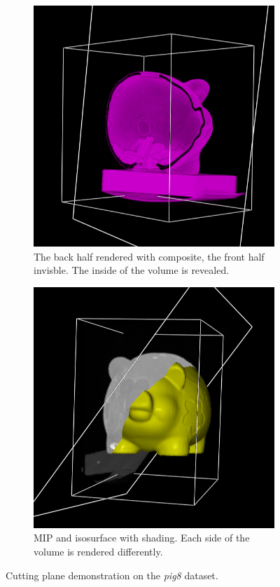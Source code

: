 \documentclass[a4paper]{article}
\begin{document}
\begin{figure}[h]
  \centering
  \begin{subfigure}[b]{0.45\textwidth}
    \centering
    \includegraphics[width=\textwidth]{pig8-cut-plane-coins}
    \caption{The back half rendered with composite, the front half invisble. The inside of the volume is revealed.}
  \end{subfigure}
  \hfill
  \begin{subfigure}[b]{0.45\textwidth}
    \centering
    \includegraphics[width=\textwidth]{pig8-cut-plane-renders}
    \caption{MIP and isosurface with shading. Each side of the volume is rendered differently.}
  \end{subfigure}
  \caption{Cutting plane demonstration on the \textit{pig8} dataset.}
  \label{fig:cutplane}
\end{figure}
\end{document}
